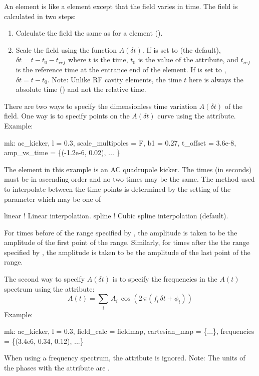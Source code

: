 An  element is like a  element except that the field varies in time. The
field is calculated in two steps:
\begin{enumerate}
\item Calculate the field the same as for a  element ().
\item Scale the field using the function $A(\delta t)$. If  is set to  (the 
default), $\delta t = t - t_0 - t_{ref}$ where $t$ is the time, $t_0$ is the value of the
 attribute, and $t_{ref}$ is the reference time at the entrance end of the element. If
 is set to , $\delta t = t - t_0$. Note: Unlike RF cavity elements,
the time $t$ here is always the absolute time () and not the relative time.
\end{enumerate}

There are two ways to specify the dimensionless time variation $A(\delta t)$ of the field. One way is to
specify points on the $A(\delta t)$ curve using the 
attribute. Example:
\begin{example}
  mk: ac_kicker, l = 0.3, scale_multipoles = F, b1 = 0.27, t_offset = 3.6e-8,
          amp_vs_time = \{(-1.2e-6, 0.02), ... \} 
\end{example}
The element in this example is an AC quadrupole kicker. The times (in seconds) must be in ascending
order and no two times may be the same. The method used to interpolate between the time points is
determined by the setting of the  parameter which may be one of
\begin{example}
  linear      ! Linear interpolation.
  spline      ! Cubic spline interpolation (default).
\end{example}
For times before of the range specified by , the amplitude is taken to be the
amplitude of the first point of the range. Similarly, for times after the the range specified by
, the amplitude is taken to be the amplitude of the last point of the range.

The second way to specify $A(\delta t)$ is to specify the frequencies in the $A(t)$ spectrum using the
 attribute:
\begin{equation}
  A(t) = \sum_i \, A_i \, \cos( 2 \, \pi (f_i \, \delta t + \phi_i))
\end{equation}
Example:
\begin{example}
  mk: ac_kicker, l = 0.3, field_calc = fieldmap, cartesian_map = \{...\},
          frequencies = \{(3.4e6, 0.34, 0.12), ...\}
\end{example}
When using a frequency spectrum, the  attribute is ignored. Note: The units of the
phases  with the  attribute are .

